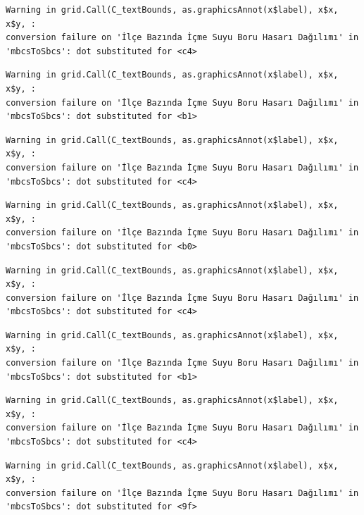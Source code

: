\documentclass[
  11pt,
  a4paper,
  DIV=11,
  numbers=noendperiod]{scrartcl}
\begin{document}
\begin{verbatim}
Warning in grid.Call(C_textBounds, as.graphicsAnnot(x$label), x$x, x$y, :
conversion failure on 'İlçe Bazında İçme Suyu Boru Hasarı Dağılımı' in
'mbcsToSbcs': dot substituted for <c4>
\end{verbatim}

\begin{verbatim}
Warning in grid.Call(C_textBounds, as.graphicsAnnot(x$label), x$x, x$y, :
conversion failure on 'İlçe Bazında İçme Suyu Boru Hasarı Dağılımı' in
'mbcsToSbcs': dot substituted for <b1>
\end{verbatim}

\begin{verbatim}
Warning in grid.Call(C_textBounds, as.graphicsAnnot(x$label), x$x, x$y, :
conversion failure on 'İlçe Bazında İçme Suyu Boru Hasarı Dağılımı' in
'mbcsToSbcs': dot substituted for <c4>
\end{verbatim}

\begin{verbatim}
Warning in grid.Call(C_textBounds, as.graphicsAnnot(x$label), x$x, x$y, :
conversion failure on 'İlçe Bazında İçme Suyu Boru Hasarı Dağılımı' in
'mbcsToSbcs': dot substituted for <b0>
\end{verbatim}

\begin{verbatim}
Warning in grid.Call(C_textBounds, as.graphicsAnnot(x$label), x$x, x$y, :
conversion failure on 'İlçe Bazında İçme Suyu Boru Hasarı Dağılımı' in
'mbcsToSbcs': dot substituted for <c4>
\end{verbatim}

\begin{verbatim}
Warning in grid.Call(C_textBounds, as.graphicsAnnot(x$label), x$x, x$y, :
conversion failure on 'İlçe Bazında İçme Suyu Boru Hasarı Dağılımı' in
'mbcsToSbcs': dot substituted for <b1>
\end{verbatim}

\begin{verbatim}
Warning in grid.Call(C_textBounds, as.graphicsAnnot(x$label), x$x, x$y, :
conversion failure on 'İlçe Bazında İçme Suyu Boru Hasarı Dağılımı' in
'mbcsToSbcs': dot substituted for <c4>
\end{verbatim}

\begin{verbatim}
Warning in grid.Call(C_textBounds, as.graphicsAnnot(x$label), x$x, x$y, :
conversion failure on 'İlçe Bazında İçme Suyu Boru Hasarı Dağılımı' in
'mbcsToSbcs': dot substituted for <9f>
\end{verbatim}
\end{document}
